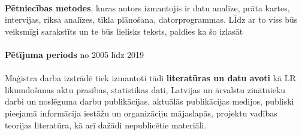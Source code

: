 \paragraph{}
\textbf{Pētniecības metodes}, kuras autors izmantojis ir datu analīze,
prāta kartes, intervijas, riksa analīzes, tīkla plānošana, datorprogrammas. LĪdz ar to viss 
būs veiksmīgi sarakstīts un te būs lielisks teksts, paldies ka šo izlasāt
\paragraph{}
\textbf{Pētījuma periods} no 2005 līdz 2019
\paragraph{}
Maģistra darba izstrādē tiek izmantoti tādi \textbf{literatūras un datu avoti} kā LR likumdošanas aktu
prasības, statistikas dati, Latvijas un ārvalstu zinātnieku darbi un noslēguma darbu publikācijas,
aktuālās publikācijas medijos, publiski pieejamā informācija iestāžu un organizāciju mājaslapās,
projektu vadības teorijas literatūra, kā arī dažādi nepublicētie materiāli.